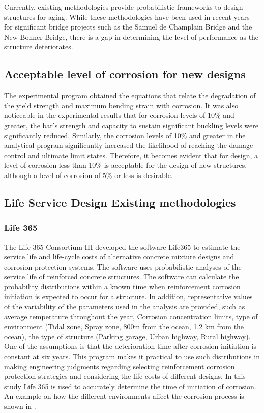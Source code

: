 Currently, existing methodologies provide probabilistic frameworks to design structures for aging. While these methodologies have been used in recent years for significant bridge projects such as the Samuel de Champlain Bridge and the New Bonner Bridge, there is a gap in determining the level of performance as the structure deteriorates.

\subsection{Acceptable level of corrosion for new designs}

The experimental program obtained the equations that relate the degradation of the yield strength and maximum bending strain with corrosion. It was also noticeable in the experimental results that for corrosion levels of 10\% and greater, the bar's strength and capacity to sustain significant buckling levels were significantly reduced. Similarly, the corrosion levels of 10\% and greater in the analytical program significantly increased the likelihood of reaching the damage control and ultimate limit states. Therefore, it becomes evident that for design, a level of corrosion less than 10\% is acceptable for the design of new structures, although a level of corrosion of 5\% or less is desirable.

\subsection{Life Service Design Existing methodologies}

\subsubsection{Life 365}

The Life 365 Consortium III developed the software Life365 to estimate the service life and life-cycle costs of alternative concrete mixture designs and corrosion protection systems\cite{Bentz2003}. The software uses probabilistic analyses of the service life of reinforced concrete structures. The software can calculate the probability distributions within a known time when reinforcement corrosion initiation is expected to occur for a structure. In addition, representative values of the variability of the parameters used in the analysis are provided, such as average temperature throughout the year, Corrosion concentration limits, type of environment (Tidal zone, Spray zone, 800m from the ocean, 1.2 km from the ocean), the type of structure (Parking garage, Urban highway, Rural highway). One of the assumptions is that the deterioration time after corrosion initiation is constant at six years. This program makes it practical to use such distributions in making engineering judgments regarding selecting reinforcement corrosion protection strategies and considering the life costs of different designs. In this study Life 365 is used to accurately determine the time of initiation of corrosion. An example on how the different environments affect the corrosion process is shown in .

